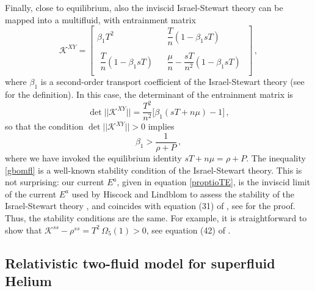 \documentclass[a4paper, amsfonts, amssymb, amsmath, reprint, showkeys, nofootinbib, twoside, onecolumn,notitlepage]{revtex4-1}
\theoremstyle{definition}
\theoremstyle{theorem}
\begin{document}
Finally, close to equilibrium, also the inviscid Israel-Stewart theory \cite{Israel_Stewart_1979} can be mapped into a multifluid, with entrainment matrix \cite{PriouCOMPAR1991}
\begin{equation}
\mathcal{K}^{XY}=
\begin{bmatrix}
   \beta_1 T^2 & & \dfrac{T}{n} (1-\beta_1 sT)  \\
     & &  \\
  \, \, \dfrac{T}{n} (1-\beta_1 sT) & & \dfrac{\mu}{n} - \dfrac{sT}{n^2} (1-\beta_1 sT) \, \, \\
\end{bmatrix} \, ,
\end{equation} 
where $\beta_1$ is a second-order transport coefficient of the Israel-Stewart theory (see \cite{Hishcock1983} for the definition). In this case, the determinant of the entrainment matrix is
\begin{equation}
\det || \mathcal{K}^{XY} || = \dfrac{T^2}{n^2} \bigg[ \beta_1 (sT+n\mu) -1 \bigg]\, ,
\end{equation}
so that the condition $\det || \mathcal{K}^{XY} || >0$ implies
\begin{equation}\label{gbomfl}
\beta_1 > \dfrac{1}{\rho +P} \, ,
\end{equation}
where we have invoked the equilibrium identity $sT + n\mu = \rho +P$. The inequality \eqref{gbomfl} is a well-known stability condition of the Israel-Stewart theory. This is not surprising: our current $E^a$, given in equation \eqref{proptioTE}, is the inviscid limit of the current $E^a$ used by Hiscock and Lindblom to assess the stability of the Israel-Stewart theory \cite{Hishcock1983}, and coincides with equation (31) of \citet{OlsonRegularCarter1990}, see \cite{GavassinoGibbs2021} for the proof. Thus, the stability conditions are the same. For example, it is straightforward to show that $\mathcal{K}^{ss}-\rho^{ss}=T^2 \, \Omega_5(1)>0$, see equation (42) of \cite{OlsonRegularCarter1990}.

\subsection{Relativistic two-fluid model for superfluid Helium}\label{4he}
\end{document}
